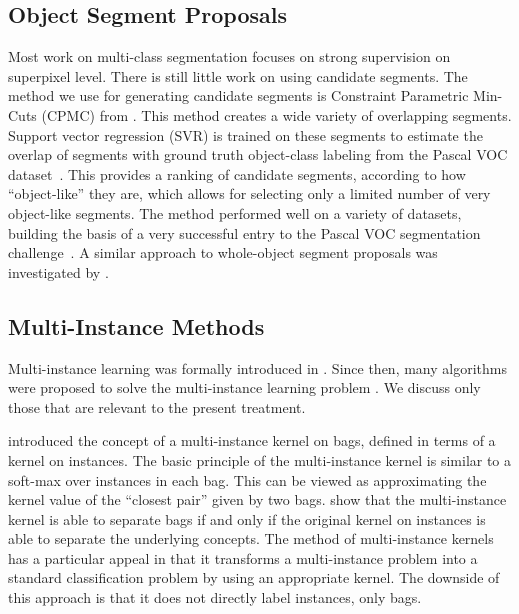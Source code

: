 \subsection{Object Segment Proposals}\label{related_segments}
Most work on multi-class segmentation focuses on strong supervision on
superpixel level. There is still little work on using candidate segments.  The
method we use for generating candidate segments is Constraint Parametric
Min-Cuts (CPMC) from \citet{carreira2010constrained}.  This method creates a
wide variety of overlapping segments. Support vector regression (SVR) is
trained on these segments to estimate the overlap of segments with ground truth
object-class labeling from the Pascal VOC dataset~\citep{pascal}. This provides
a ranking of candidate segments, according to how ``object-like'' they are,
which allows for selecting only a limited number of very object-like segments.
The method performed well on a variety of datasets, building the basis of
a very successful entry to the Pascal VOC segmentation
challenge~\citep{li2010object}. A similar approach to whole-object segment
proposals was investigated by \citet{endres2010category}.

\subsection{Multi-Instance Methods}
Multi-instance learning was formally introduced in \citet{dietterich1997solving}.
Since then, many algorithms were proposed to solve the multi-instance learning problem
\citep{andrews2003support,gaertner2002multi,zhou2009multi,li2009convex,zhang2002dd,mangasarian2008multiple,leistner2010miforests,chen2006miles}.
We discuss only those that are relevant to the present treatment.

\citet{gaertner2002multi} introduced the concept of a multi-instance
kernel on bags, defined in terms of a kernel on instances. 
The basic principle of the multi-instance kernel is similar to a soft-max over instances in
each bag. This can be viewed as approximating the kernel value of the ``closest pair'' given by two bags. \citet{gaertner2002multi} show that the multi-instance kernel
is able to separate bags if and only if the original kernel on instances is able to separate the underlying concepts.
The method of multi-instance kernels has a particular appeal in that it transforms a multi-instance problem into a standard
classification problem by using an appropriate kernel. The downside of this approach is that it does
not directly label instances, only bags.


